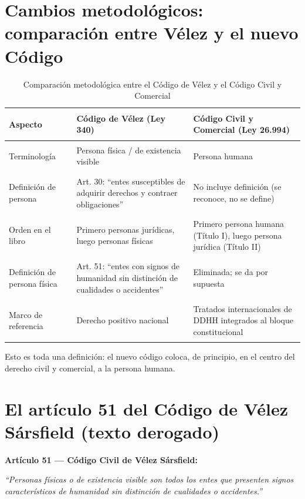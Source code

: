 \documentclass[12pt,oneside]{book}
\begin{document}
\section{Cambios metodológicos: comparación entre Vélez y el nuevo Código}

\begin{table}[H]
\centering
\begin{tabularx}{\textwidth}{>{\bfseries\raggedright\arraybackslash}p{} X X}
\toprule
\textbf{Aspecto} & \textbf{Código de Vélez (Ley 340)} & \textbf{Código Civil y Comercial (Ley 26.994)} \\
\midrule
Terminología & Persona física / de existencia visible & Persona humana \\
Definición de persona & Art. 30: ``entes susceptibles de adquirir derechos y contraer obligaciones'' & No incluye definición (se reconoce, no se define) \\
Orden en el libro & Primero personas jurídicas, luego personas físicas & Primero persona humana (Título I), luego persona jurídica (Título II) \\
Definición de persona física & Art. 51: ``entes con signos de humanidad sin distinción de cualidades o accidentes'' & Eliminada; se da por supuesta \\
Marco de referencia & Derecho positivo nacional & Tratados internacionales de DDHH integrados al bloque constitucional \\
\bottomrule
\end{tabularx}
\caption{Comparación metodológica entre el Código de Vélez y el Código Civil y Comercial}
\end{table}

\begin{important}
Esto es toda una definición: el nuevo código coloca, de principio, en el centro del derecho civil y comercial, a la persona humana.
\end{important}

\section{El artículo 51 del Código de Vélez Sársfield (texto derogado)}

\begin{note}
\textbf{Artículo 51 --- Código Civil de Vélez Sársfield:}

\textit{``Personas físicas o de existencia visible son todos los entes que presenten signos característicos de humanidad sin distinción de cualidades o accidentes.''}
\end{note}
\end{document}
